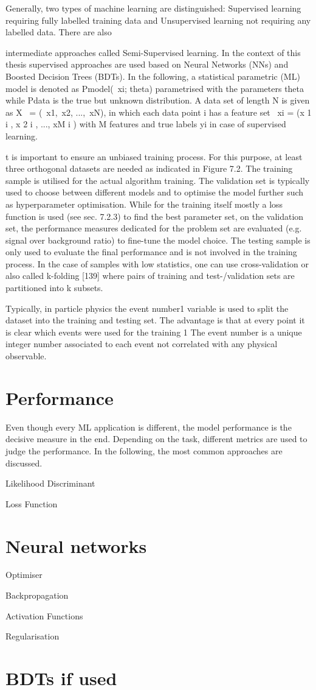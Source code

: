 Generally, two types of machine learning are distinguished: Supervised learning requiring fully
labelled training data and Unsupervised learning not requiring any labelled data. There are also

intermediate approaches called Semi-Supervised learning. In the context of this thesis supervised
approaches are used based on Neural Networks (NNs) and Boosted Decision Trees (BDTs).
In the following, a statistical parametric (ML) model is denoted as Pmodel(~xi; theta) parametrised with
the parameters theta while Pdata is the true but unknown distribution. A data set of length N is given
as X~ = (~x1,~x2, ...,~xN), in which each data point i has a feature set ~xi = (x
1
i
, x
2
i
, ..., xM
i
) with M
features and true labels yi in case of supervised learning.

t is important to ensure an unbiased training process. For this purpose, at least three orthogonal
datasets are needed as indicated in Figure 7.2. The training sample is utilised for the actual algorithm
training. The validation set is typically used to choose between different models and to optimise
the model further such as hyperparameter optimisation. While for the training itself mostly a loss
function is used (see sec. 7.2.3) to find the best parameter set, on the validation set, the performance
measures dedicated for the problem set are evaluated (e.g. signal over background ratio) to fine-tune
the model choice. The testing sample is only used to evaluate the final performance and is not involved in the training process. In the case of samples with low statistics, one can use cross-validation
or also called k-folding [139] where pairs of training and test-/validation sets are partitioned into k
subsets.

Typically, in particle physics the event number1 variable is used to split the dataset into the training
and testing set. The advantage is that at every point it is clear which events were used for the training
1 The event number is a unique integer number associated to each event not correlated with any physical observable.
\section{Performance}

Even though every ML application is different, the model performance is the decisive measure in the
end. Depending on the task, different metrics are used to judge the performance. In the following,
the most common approaches are discussed.

Likelihood Discriminant

Loss Function

\section{Neural networks}

Optimiser

Backpropagation

Activation Functions

Regularisation

\section{BDTs if used}